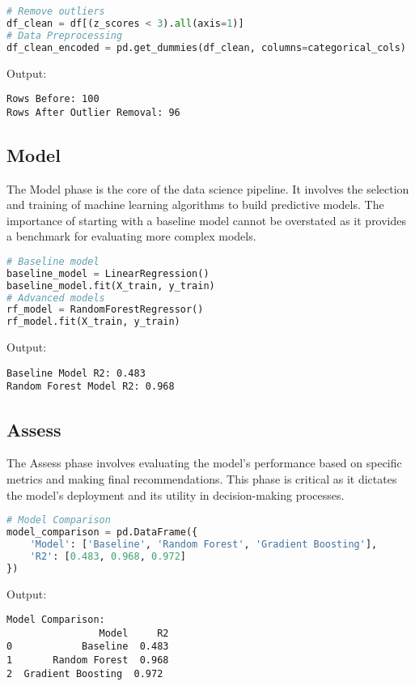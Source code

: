 \documentclass[12pt]{article}
\begin{document}
\begin{lstlisting}[language=Python]
# Remove outliers
df_clean = df[(z_scores < 3).all(axis=1)]
# Data Preprocessing
df_clean_encoded = pd.get_dummies(df_clean, columns=categorical_cols)
\end{lstlisting}

Output:

\begin{verbatim}
Rows Before: 100
Rows After Outlier Removal: 96
\end{verbatim}

\subsection{Model}

The Model phase is the core of the data science pipeline. It involves the selection and training of machine learning algorithms to build predictive models. The importance of starting with a baseline model cannot be overstated as it provides a benchmark for evaluating more complex models.

\begin{lstlisting}[language=Python]
# Baseline model
baseline_model = LinearRegression()
baseline_model.fit(X_train, y_train)
# Advanced models
rf_model = RandomForestRegressor()
rf_model.fit(X_train, y_train)
\end{lstlisting}

Output:

\begin{verbatim}
Baseline Model R2: 0.483
Random Forest Model R2: 0.968
\end{verbatim}

\subsection{Assess}

The Assess phase involves evaluating the model's performance based on specific metrics and making final recommendations. This phase is critical as it dictates the model's deployment and its utility in decision-making processes.

\begin{lstlisting}[language=Python]
# Model Comparison
model_comparison = pd.DataFrame({
    'Model': ['Baseline', 'Random Forest', 'Gradient Boosting'],
    'R2': [0.483, 0.968, 0.972]
})
\end{lstlisting}

Output:

\begin{verbatim}
Model Comparison:
                Model     R2
0            Baseline  0.483
1       Random Forest  0.968
2  Gradient Boosting  0.972
\end{verbatim}
\end{document}
